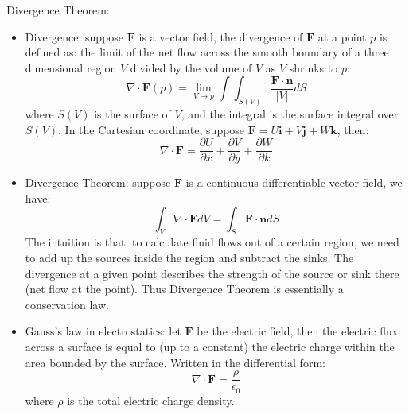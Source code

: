 \documentclass{report}
\begin{document}
Divergence Theorem: 
\begin{itemize}
\item Divergence: suppose $\mathbf{F}$ is a vector field, the divergence of $\mathbf{F}$ at a point $p$ is defined as: the limit of the net flow across the smooth boundary of a three dimensional region $V$ divided by the volume of $V$ as $V$ shrinks to $p$:
\begin{equation}
\nabla \cdot \mathbf{F}(p) = \lim_{V \rightarrow p} \int \int_{S(V)} \frac{\mathbf{F} \cdot \mathbf{n}}{|V|} dS
\end{equation}
where $S(V)$ is the surface of $V$, and the integral is the surface integral over $S(V)$. In the Cartesian coordinate, suppose $\mathbf{F} = U \mathbf{i} + V \mathbf{j} + W \mathbf{k}$, then: 
\begin{equation}
\nabla \cdot \mathbf{F} = \frac{\partial U}{\partial x} + \frac{\partial V}{\partial y} + \frac{\partial W}{\partial k}
\end{equation}

\item Divergence Theorem: suppose $\mathbf{F}$ is a continuous-differentiable vector field, we have: 
\begin{equation}
\int_V \nabla \cdot \mathbf{F} dV = \int_S \mathbf{F} \cdot \mathbf{n} dS	
\end{equation}
The intuition is that: to calculate fluid flows out of a certain region, we need to add up the sources inside the region and subtract the sinks. The divergence at a given point describes the strength of the source or sink there (net flow at the point). Thus Divergence Theorem is essentially a conservation law. 

\item Gauss's law in electrostatics: let $\mathbf{F}$ be the electric field, then the electric flux across a surface is equal to (up to a constant) the electric charge within the area bounded by the surface. Written in the differential form: 
\begin{equation}
\nabla \cdot \mathbf{F} = \frac{\rho}{\epsilon_0}	
\end{equation}
where $\rho$ is the total electric charge density. 
\end{itemize}
\end{document}
